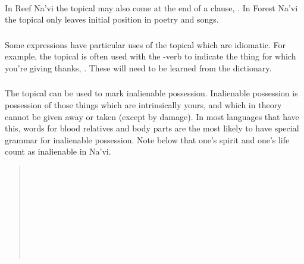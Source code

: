 \paragraph{} 
In Reef Na'vi the topical may also come at the end of a
clause,  .  In Forest Na'vi the topical only leaves initial position in
poetry and songs.  \Omaticon

\subsubsection{} Some expressions have particular uses of the topical
which are idiomatic.  For example, the topical is often used with
the -verb   to indicate the thing for
which you're giving thanks,  .
These will need to be learned from the dictionary.

\subsubsection{} The topical can be used to mark inalienable
possession.  Inalienable possession is posses\-sion of those things
which are intrinsically yours, and which in theory cannot be given
away or taken (except by damage).  In most languages that have this,
words for blood relatives and body parts are the most likely to have
special grammar for inalienable possession.  Note below that one's
spirit and one's life count as inalienable in Na'vi.

\begin{quotation}
\noindent{} \\
\noindent{} \\
\noindent{}\\
\indent{}\\
\noindent{}\\
\indent{}\\
\noindent{} \\
\noindent{}\\
\indent{}
\end{quotation}

